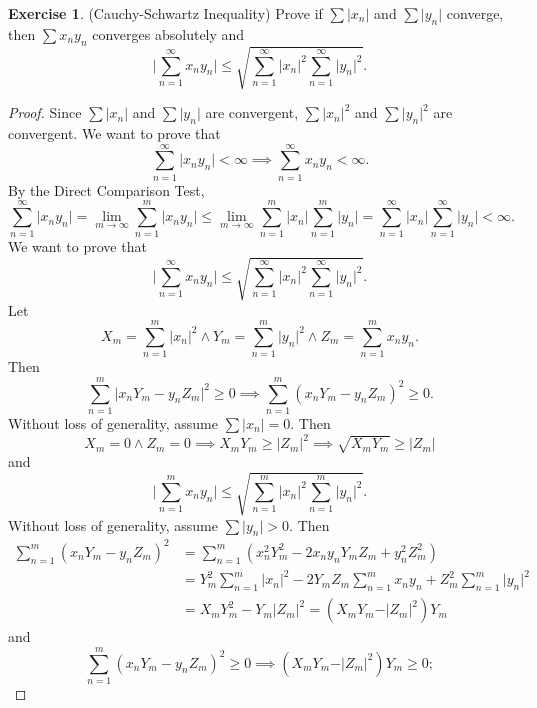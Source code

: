 \documentclass[12pt]{article}
\theoremstyle{definition}
\newtheorem{exercise}{Exercise}
\begin{document}
\begin{exercise}
    (Cauchy-Schwartz Inequality) Prove if \(\sum \vert x_n \vert\) and \(\sum \vert y_n \vert\) converge, then \(\sum x_ny_n\) converges absolutely and
    \[
        \bigg\vert \sum_{n = 1}^{\infty}x_ny_n \bigg\vert \leq \sqrt{\sum_{n = 1}^{\infty}\vert x_n \vert^2\sum_{n = 1}^{\infty}\vert y_n \vert^2}.
    \]
\end{exercise}

\begin{proof}
    Since \(\sum \vert x_n \vert\) and \(\sum \vert y_n \vert\) are convergent, \(\sum \vert x_n \vert^2\) and \(\sum \vert y_n \vert^2\) are convergent. We want to prove that 
    \[
        \sum_{n = 1}^{\infty}\vert x_ny_n \vert < \infty \implies \sum_{n = 1}^{\infty}x_ny_n < \infty.
    \]
    By the Direct Comparison Test,
    \[
        \sum_{n = 1}^{\infty}\vert x_ny_n \vert = \lim_{m \to \infty}\sum_{n = 1}^{m}\vert x_ny_n \vert \leq \lim_{m \to \infty}\sum_{n = 1}^{m}\vert x_n \vert \sum_{n = 1}^{m}\vert y_n \vert = \sum_{n = 1}^{\infty}\vert x_n \vert\sum_{n = 1}^{\infty}\vert y_n \vert < \infty.
    \]
    We want to prove that
    \[
        \bigg\vert \sum_{n = 1}^{\infty}x_ny_n \bigg\vert \leq \sqrt{\sum_{n = 1}^{\infty}\vert x_n \vert^2\sum_{n = 1}^{\infty}\vert y_n \vert^2}.
    \]
    Let 
    \[
        X_m = \sum_{n = 1}^{m} \vert x_n \vert^2  \land Y_m = \sum_{n = 1}^{m}\vert y_n \vert^2 \land Z_m = \sum_{n = 1}^{m}x_ny_n.
    \]
    Then 
    \[
        \sum_{n = 1}^{m}\vert x_nY_m - y_nZ_m \vert^2 \geq 0 \implies \sum_{n = 1}^{m}(x_nY_m - y_nZ_m)^2 \geq 0.
    \]
    Without loss of generality, assume \(\sum \vert x_n \vert = 0\). Then
    \[
        X_m = 0 \land Z_m = 0 \implies X_mY_m \geq \vert Z_m \vert^2 \implies \sqrt{X_mY_m} \geq \vert Z_m \vert
    \]
    and
    \[
        \bigg\vert \sum_{n = 1}^{m}x_ny_n \bigg\vert \leq \sqrt{\sum_{n = 1}^{m}\vert x_n \vert^2\sum_{n = 1}^{m}\vert y_n \vert^2}. 
    \]
    Without loss of generality, assume \(\sum \vert y_n \vert > 0\). Then 
    \begin{align*}
        \sum_{n = 1}^m(x_nY_m - y_nZ_m)^2 &= \sum_{n = 1}^m(x_n^2Y_m^2 - 2x_ny_nY_mZ_m + y_n^2Z_m^2) \\
        &= Y_m^2\sum_{n = 1}^{m}\vert x_n \vert^2 - 2Y_mZ_m\sum_{n = 1}^{m}x_ny_n + Z_m^2\sum_{n = 1}^{m}\vert y_n \vert^2 \\
        &= X_mY_m^2 - Y_m\vert Z_m \vert^2 = (X_mY_m - \vert Z_m \vert^2)Y_m
    \end{align*}
    and
    \[
        \sum_{n = 1}^m(x_nY_m - y_nZ_m)^2 \geq 0 \implies (X_mY_m - \vert Z_m \vert^2)Y_m \geq 0;
\]
\end{proof}
\end{document}
